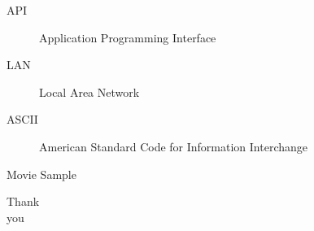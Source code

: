 \documentclass[aspectratio=43]{beamer}
\begin{document}
\begin{frame}
    \begin{description}
        \item[API] Application Programming Interface
        \item[LAN] Local Area Network
        \item[ASCII] American Standard Code for Information Interchange
    \end{description}
\end{frame}

\begin{frame}{Movie Sample}
    \centering
\end{frame}

\begin{frame}
    \centering

    \Huge

    Thank\\
    you
\end{frame}
\end{document}
